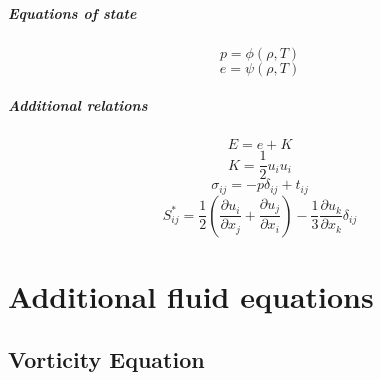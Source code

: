 \documentclass[oneside,a4paper,11pt]{report}
\begin{document}
\paragraph{Equations of state}

\begin{equation*}
    p = \phi (\rho, T)
\end{equation*}
\begin{equation*}
    e = \psi (\rho, T)
\end{equation*}

\paragraph{Additional relations}

\begin{equation*}
    E = e + K
\end{equation*}
\begin{equation*}
    K = \frac{1}{2} u_i u_i
\end{equation*}
\begin{equation*}
    \sigma_{ij} = -p \delta_{ij} + t_{ij}
\end{equation*}
\begin{equation*}
    S^*_{ij} = \frac{1}{2} \left ( \frac{\partial u_i}{\partial x_j} + \frac{\partial u_j}{\partial x_i} \right ) - \frac{1}{3} \frac{\partial u_k}{\partial x_k} \delta_{ij}
\end{equation*}

\chapter{Additional fluid equations}

\section{Vorticity Equation}
\end{document}
